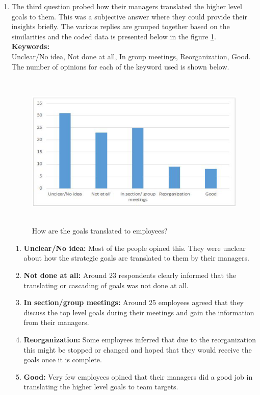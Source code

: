 \begin{enumerate}
    \item The third question probed how their managers translated the higher level goals to them. This was a subjective answer where they could provide their insights briefly. The various replies are grouped together based on the similarities and the coded data is presented below in the figure \ref{fig:5.10}.\\
    \textbf{Keywords:}\\
    Unclear/No idea, Not done at all, In group meetings, Reorganization, Good. 
    The number of opinions for each of the keyword used is shown below. \\

\begin{figure}[H]
    \centering
    \captionsetup{justification=centering, margin=2cm}
    \vspace{1cm}
    \includegraphics[width=12cm, height=7.5cm]{figure/auxiliary/fig510.PNG}
    \caption{ How are the goals translated to employees?}
    \label{fig:5.10}
\end{figure}
  
    \begin{enumerate}
    \item \textbf{Unclear/No idea:} Most of the people opined this. They were unclear about how the strategic goals are translated to them by their managers.\\
    \item \textbf{Not done at all:} Around 23 respondents clearly informed that the translating or cascading of goals was not done at all.\\
    \item \textbf{In section/group meetings:} Around 25 employees agreed that they discuss the top level goals during their meetings and gain the information from their managers.\\
    \item \textbf{Reorganization:} Some employees inferred that due to the reorganization this might be stopped or changed and hoped that they would receive the goals once it is complete.\\
    \item \textbf{Good:} Very few employees opined that their managers did a good job in translating the higher level goals to team targets.\\
\end{enumerate}
\end{enumerate}

